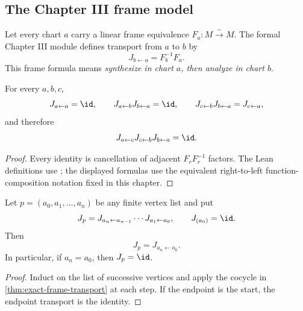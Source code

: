 \subsection{The Chapter III frame model}

Let every chart $a$ carry a linear frame equivalence
$F_a:M\xrightarrow{\sim}M$.  The formal Chapter III module defines transport
from $a$ to $b$ by
\[
J_{b\leftarrow a}=F_b^{-1}F_a.
\]
This frame formula means \emph{synthesize in chart \(a\), then
analyze in chart \(b\)}.

\begin{theorem}
\label{thm:exact-frame-transport}
For every $a,b,c$,
\[
J_{a\leftarrow a}=\id,\qquad
J_{a\leftarrow b}J_{b\leftarrow a}=\id,\qquad
J_{c\leftarrow b}J_{b\leftarrow a}=J_{c\leftarrow a},
\]
and therefore
\[
J_{a\leftarrow c}J_{c\leftarrow b}J_{b\leftarrow a}=\id.
\]
\end{theorem}

\begin{proof}
Every identity is cancellation of adjacent $F_rF_r^{-1}$ factors.  The Lean
definitions use ; the displayed formulas use the
equivalent right-to-left function-composition notation fixed in this chapter.
\end{proof}

\begin{theorem}
\label{thm:exact-path-transport}
Let $p=(a_0,a_1,\ldots,a_n)$ be any finite vertex list and put
\[
J_p
=J_{a_n\leftarrow a_{n-1}}\cdots J_{a_1\leftarrow a_0},
\qquad
J_{(a_0)}=\id.
\]
Then
\[
J_p=J_{a_n\leftarrow a_0}.
\]
In particular, if $a_n=a_0$, then $J_p=\id$.
\end{theorem}

\begin{proof}
Induct on the list of successive vertices and apply the cocycle in
\cref{thm:exact-frame-transport} at each step.  If the endpoint is the start,
the endpoint transport is the identity.
\end{proof}

